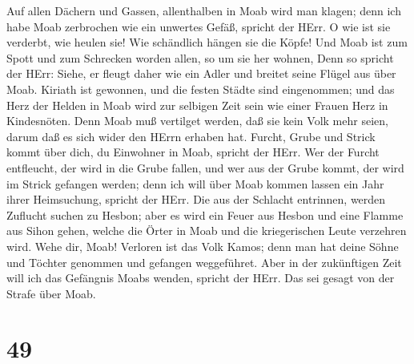  Auf allen Dächern und Gassen, allenthalben in Moab wird
man klagen; denn ich habe Moab zerbrochen wie ein unwertes Gefäß,
spricht der HErr.  O wie ist sie verderbt, wie heulen sie!
Wie schändlich hängen sie die Köpfe! Und Moab ist zum Spott und zum
Schrecken worden allen, so um sie her wohnen,  Denn so
spricht der HErr: Siehe, er fleugt daher wie ein Adler und breitet seine
Flügel aus über Moab.  Kiriath ist gewonnen, und die festen
Städte sind eingenommen; und das Herz der Helden in Moab wird zur
selbigen Zeit sein wie einer Frauen Herz in Kindesnöten. 
Denn Moab muß vertilget werden, daß sie kein Volk mehr seien, darum daß
es sich wider den HErrn erhaben hat.  Furcht, Grube und
Strick kommt über dich, du Einwohner in Moab, spricht der HErr.
 Wer der Furcht entfleucht, der wird in die Grube fallen,
und wer aus der Grube kommt, der wird im Strick gefangen werden; denn
ich will über Moab kommen lassen ein Jahr ihrer Heimsuchung, spricht der
HErr.  Die aus der Schlacht entrinnen, werden Zuflucht
suchen zu Hesbon; aber es wird ein Feuer aus Hesbon und eine Flamme aus
Sihon gehen, welche die Örter in Moab und die kriegerischen Leute
verzehren wird.  Wehe dir, Moab! Verloren ist das Volk
Kamos; denn man hat deine Söhne und Töchter genommen und gefangen
weggeführet.  Aber in der zukünftigen Zeit will ich das
Gefängnis Moabs wenden, spricht der HErr. Das sei gesagt von der Strafe
über Moab.

\hypertarget{section-48}{%
\section{49}\label{section-48}}

